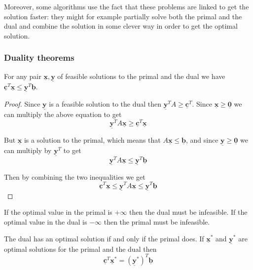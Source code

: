 \documentclass[14pt]{extarticle}
\renewcommand{\vec}[1]{\underline{\mathbf{#1}}}
\begin{document}
Moreover, some algorithms use the fact that these problems are linked to get the solution faster:
they might for example partially solve both the primal and the dual and combine the solution in some clever way in order to get the optimal solution.

\subsubsection{Duality theorems}

\begin{theorem}
    For any pair $\vec x, \vec y$ of feasible solutions to the primal and the dual we have $\vec c^T \vec x \leq \vec y^T \vec b$.
\end{theorem}

\begin{proof}
    Since $\vec y$ is a feasible solution to the dual then $\vec y^T A \geq \vec c^T$.
    Since $\vec x \geq \vec 0$ we can multiply the above equation to get
    \begin{equation}
        \vec y^T A \vec x \geq \vec c^T \vec x
    \end{equation}

    But $\vec x$ is a solution to the primal, which means that $A \vec x \leq \vec b$, and since $\vec y \geq \vec 0$ we can multiply by $\vec y^T$ to get
    \begin{equation}
        \vec y^T A \vec x \leq \vec y^T \vec b
    \end{equation}

    Then by combining the two inequalities we get
    \begin{equation}
        \vec c^T \vec x \leq \vec y^T A \vec x \leq \vec y^T \vec b
    \end{equation}
\end{proof}

\begin{theorem}
    If the optimal value in the primal is $+\infty$ then the dual must be infeasible.
    If the optimal value in the dual is $-\infty$ then the primal must be infeasible.
\end{theorem}

\begin{theorem}
    \label{thm:linear:strong_duality}
    The dual has an optimal solution if and only if the primal does.
    If $\vec x^*$ and $\vec y^*$ are optimal solutions for the primal and the dual then
    \begin{equation}
        \vec c^T \vec x^* = \left(\vec y^*\right)^T \vec b
    \end{equation}
\end{theorem}
\end{document}
